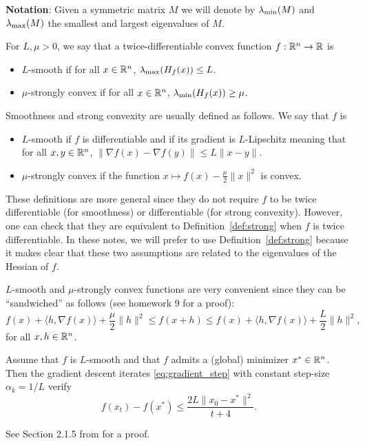 \documentclass[11pt,nocut]{article}
\begin{document}
\textbf{Notation}: Given a symmetric matrix $M$ we will denote by $\lambda_{\rm min}(M)$ and $\lambda_{\rm max}(M)$ the smallest and largest eigenvalues of $M$. 
\begin{definition}\label{def:strong}
	For $L,\mu >0$, we say that a twice-differentiable convex function $f: \mathbb{R}^n \to \mathbb{R}$ is
	\begin{itemize}
		\item $L$-smooth if for all $x \in \mathbb{R}^n$, $\lambda_{\rm max}(H_f(x)) \leq L$.
		\item $\mu$-strongly convex if for all $x \in \mathbb{R}^n$, $\lambda_{\rm min}(H_f(x)) \geq \mu$.
	\end{itemize}
\end{definition}
\begin{remark}
	Smoothness and strong convexity are usually defined as follows. We say that $f$ is
	\begin{itemize}
		\item $L$-smooth if $f$ is differentiable and if its gradient is $L$-Lipschitz meaning that for all $x,y \in \mathbb{R}^n$, $\| \nabla f(x) - \nabla f(y) \| \leq L \|x-y\|$.
		\item $\mu$-strongly convex if the function $x \mapsto f(x) - \frac{\mu}{2} \|x\|^2$ is convex.
	\end{itemize}
	These definitions are more general since they do not require $f$ to be twice differentiable (for smoothness) or differentiable (for strong convexity). However, one can check that they are equivalent to Definition~\ref{def:strong} when $f$ is twice differentiable. In these notes, we will prefer to use Definition~\ref{def:strong} because it makes clear that these two assumptions are related to the eigenvalues of the Hessian of $f$.
\end{remark}

\begin{remark}\label{rem:sandwich}
	$L$-smooth and $\mu$-strongly convex functions are very convenient since they can be ``sandwiched'' as follows (see homework 9 for a proof):
	$$
	f(x) + \langle h ,\nabla f(x) \rangle + \frac{\mu}{2} \|h\|^2 
	\leq f(x+h) \leq
	f(x) + \langle h ,\nabla f(x) \rangle + \frac{L}{2} \|h\|^2,
	$$
	for all $x,h \in\mathbb{R}^n$.
\end{remark}

\begin{theorem}\label{th:gradient1}
	Assume that $f$ is $L$-smooth and that $f$ admits a (global) minimizer $x^* \in \mathbb{R}^n$. Then
	the gradient descent iterates \eqref{eq:gradient_step} with constant step-size $\alpha_k = 1/L$ verify
	$$
	f(x_t) - f(x^*) \leq \frac{2 L \| x_0 - x^* \|^2}{t+4}.
	$$
\end{theorem}
See Section 2.1.5 from \cite{nesterov2018lectures} for a proof.
\end{document}
